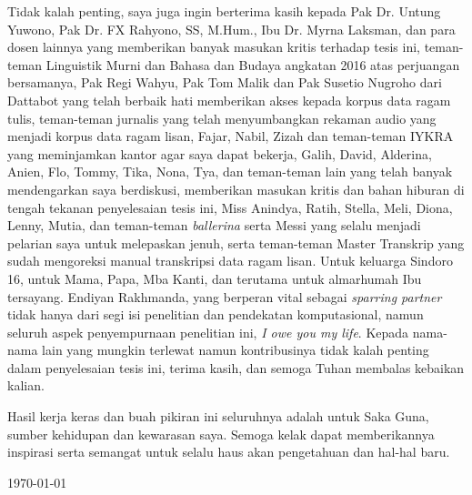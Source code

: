 Tidak kalah penting, saya juga ingin berterima kasih kepada Pak Dr. Untung Yuwono, Pak Dr. FX Rahyono, SS, M.Hum., Ibu Dr. Myrna Laksman, dan para dosen lainnya yang memberikan banyak masukan kritis terhadap tesis ini, teman-teman Linguistik Murni dan Bahasa dan Budaya angkatan 2016 atas perjuangan bersamanya, Pak Regi Wahyu, Pak Tom Malik dan Pak Susetio Nugroho dari Dattabot yang telah berbaik hati memberikan akses kepada korpus data ragam tulis, teman-teman jurnalis yang telah menyumbangkan rekaman audio yang menjadi korpus data ragam lisan, Fajar, Nabil, Zizah dan teman-teman IYKRA yang meminjamkan kantor agar saya dapat bekerja, Galih, David, Alderina, Anien, Flo, Tommy, Tika, Nona, Tya, dan teman-teman lain yang telah banyak mendengarkan saya berdiskusi, memberikan masukan kritis dan bahan hiburan di tengah tekanan penyelesaian tesis ini, Miss Anindya, Ratih, Stella, Meli, Diona, Lenny, Mutia, dan teman-teman \textit{ballerina} serta Messi yang selalu menjadi pelarian saya untuk melepaskan jenuh, serta teman-teman Master Transkrip yang sudah mengoreksi manual transkripsi data ragam lisan. Untuk keluarga Sindoro 16, untuk Mama, Papa, Mba Kanti, dan terutama untuk almarhumah Ibu tersayang. Endiyan Rakhmanda, yang berperan vital sebagai \textit{sparring partner} tidak hanya dari segi isi penelitian dan pendekatan komputasional, namun seluruh aspek penyempurnaan penelitian ini, \textit{I owe you my life}. Kepada nama-nama lain yang mungkin terlewat namun kontribusinya tidak kalah penting dalam penyelesaian tesis ini, terima kasih, dan semoga Tuhan membalas kebaikan kalian.

Hasil kerja keras dan buah pikiran ini seluruhnya adalah untuk Saka Guna, sumber kehidupan dan kewarasan saya. Semoga kelak dapat memberikannya inspirasi serta semangat untuk selalu haus akan pengetahuan dan hal-hal baru.

\vspace*{0.1cm}
\begin{flushright}
\today\\[0.1cm]
\vspace*{1cm}
\penulis

\end{flushright}